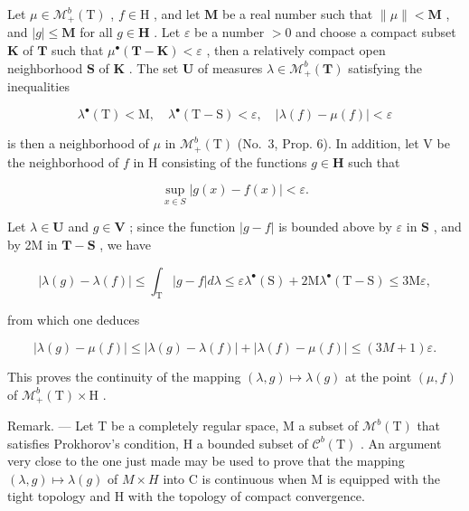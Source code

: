 Let \(\mu \in \mathcal{M}_{+}^{b}(\mathrm{T})\) , \(f \in \mathrm{H}\) , and let \(\mathbf{M}\) be a real number such that \(\| \mu \| < \mathbf{M}\) , and \(|g| \leqslant \mathbf{M}\) for all \(g \in \mathbf{H}\) . Let \(\varepsilon\) be a number \(>0\) and choose a compact subset \(\mathbf{K}\) of \(\mathbf{T}\) such that \(\mu^{\bullet}(\mathbf{T} - \mathbf{K}) < \varepsilon\) , then a relatively compact open neighborhood \(\mathbf{S}\) of \(\mathbf{K}\) . The set \(\mathbf{U}\) of measures \(\lambda \in \mathcal{M}_{+}^{b}(\mathbf{T})\) satisfying the inequalities

\[
\lambda^ {\bullet} (\mathrm{T}) <   \mathrm{M}, \quad \lambda^ {\bullet} (\mathrm{T} - \mathrm{S}) <   \varepsilon , \quad | \lambda (f) - \mu (f) | <   \varepsilon
\]

is then a neighborhood of \(\mu\) in \(\mathcal{M}_+^b (\mathrm{T})\) (No.~3, Prop. 6). In addition, let V be the neighborhood of \(f\) in H consisting of the functions \(g\in \mathbf{H}\) such that

\[
\sup _ {x \in S} | g (x) - f (x) | <   \varepsilon .
\]

Let \(\lambda \in \mathbf{U}\) and \(g\in \mathbf{V}\) ; since the function \(|g - f|\) is bounded above by \(\varepsilon\) in \(\mathbf{S}\) , and by 2M in \(\mathbf{T} - \mathbf{S}\) , we have

\[
\left| \lambda (g) - \lambda (f) \right| \leqslant \int_ {\mathrm{T}} | g - f | d \lambda \leqslant \varepsilon \lambda^ {\bullet} (\mathrm{S}) + 2 \mathrm{M} \lambda^ {\bullet} (\mathrm{T} - \mathrm{S}) \leqslant 3 \mathrm{M} \varepsilon ,
\]

from which one deduces

\[
\left| \lambda (g) - \mu (f) \right| \leqslant \left| \lambda (g) - \lambda (f) \right| + \left| \lambda (f) - \mu (f) \right| \leqslant (3 M + 1) \varepsilon .
\]

This proves the continuity of the mapping \((\lambda, g) \mapsto \lambda(g)\) at the point \((\mu, f)\) of \(\mathcal{M}_+^b(\mathrm{T}) \times \mathrm{H}\) .

Remark. --- Let T be a completely regular space, M a subset of \(\mathcal{M}^{b}(\mathrm{T})\) that satisfies Prokhorov's condition, H a bounded subset of \(\mathcal{C}^{b}(\mathrm{T})\) . An argument very close to the one just made may be used to prove that the mapping \((\lambda,g)\mapsto\lambda(g)\) of \(M\times H\) into C is continuous when M is equipped with the tight topology and H with the topology of compact convergence.

